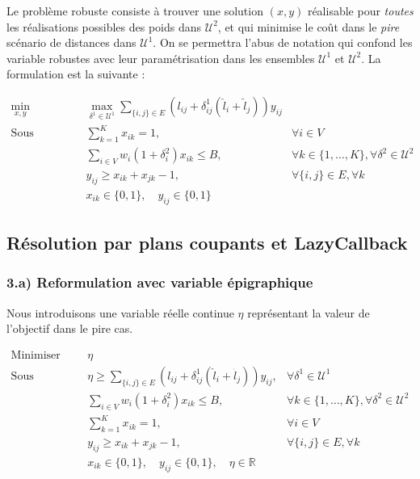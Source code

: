 \documentclass{article}
\begin{document}
Le problème robuste consiste à trouver une solution $(x,y)$ réalisable pour \textit{toutes} les réalisations possibles des poids dans $\mathcal{U}^2$, et qui minimise le coût dans le \textit{pire} scénario de distances dans $\mathcal{U}^1$. On se permettra l'abus de notation qui confond les variable robustes avec leur paramétrisation dans les ensembles $\mathcal{U}^1$ et $\mathcal{U}^2$.
\newpage
La formulation est la suivante :

\begin{align}
    \min_{x,y} \quad & \max_{\delta^1 \in \mathcal{U}^1} \sum_{\{i,j\} \in E} \left( l_{ij} + \delta_{ij}^1 (\hat{l}_i + \hat{l}_j) \right) y_{ij} \label{obj:robust} \\
    \text{Sous contraintes} \quad & \sum_{k=1}^{K} x_{ik} = 1, & \forall i \in V \\
    & \sum_{i \in V} w_i (1 + \delta_{i}^2) x_{ik} \le B, & \forall k \in \{1, \dots, K\}, \forall \delta^2 \in \mathcal{U}^2 \label{const:robust_cap} \\
    & y_{ij} \ge x_{ik} + x_{jk} - 1, & \forall \{i,j\} \in E, \forall k \\
    & x_{ik} \in \{0,1\}, \quad y_{ij} \in \{0,1\}
\end{align}

\subsection{Résolution par plans coupants et LazyCallback}

\subsubsection*{3.a) Reformulation avec variable épigraphique}

Nous introduisons une variable réelle continue $\eta$ représentant la valeur de l'objectif dans le pire cas.

\begin{align}
    \text{Minimiser} \quad & \eta \\
    \text{Sous contraintes} \quad & \eta \ge \sum_{\{i,j\} \in E} \left( l_{ij} + \delta_{ij}^1 (\hat{l}_i + \hat{l}_j) \right) y_{ij}, & \forall \delta^1 \in \mathcal{U}^{1} \label{const:cut_obj} \\
    & \sum_{i \in V} w_i (1 + \delta_{i}^2) x_{ik} \le B, & \forall k \in \{1, \dots, K\}, \forall \delta^2 \in \mathcal{U}^{2} \label{const:cut_cap} \\
    & \sum_{k=1}^{K} x_{ik} = 1, & \forall i \in V \\
    & y_{ij} \ge x_{ik} + x_{jk} - 1, & \forall \{i,j\} \in E, \forall k \\
    & x_{ik} \in \{0,1\}, \quad y_{ij} \in \{0,1\}, \quad \eta \in \mathbb{R}
\end{align}
\end{document}

